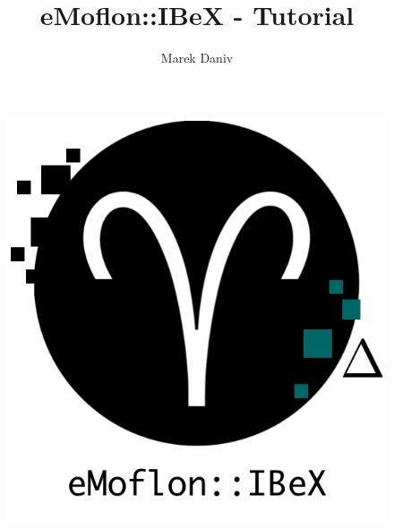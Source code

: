 \documentclass[
	ngerman,
	xcolor=(dvipsnames,svgnames,table),
	type=intern,
	marginpar=false,%
	accentcolor=1b,%
	logofile = FB_logo_edit.png
]{tudapub}
\begin{document}
\frontmatter

\title{eMoflon::IBeX - Tutorial}
\author{Marek Daniv}%

\maketitle

\begin{figure}[h]
	\centering
	\includegraphics[scale=0.6]{pictures/eMoflonLogoIbex.png}
\end{figure}

\newpage
\tableofcontents

\mainmatter









%
%
	
\end{document}

